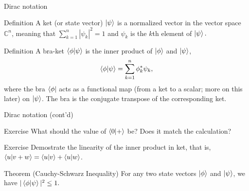 \documentclass{beamer}
\newcommand{\C}{\mathbb{C}}
\begin{document}
\begin{frame}{Dirac notation}

\begin{block}{Definition}
A ket (or state vector) $\ket{\psi}$ is a normalized vector in the vector space $\C^n$, meaning that $\sum_{k=1}^n |\psi_k|^2 = 1$  and $\psi_k$ is the $k$th element of $\ket\psi.$
\end{block}

\begin{block}{Definition}
A bra-ket $\braket{\phi|\psi}$ is the inner product of $\ket\phi$ and $\ket\psi$, $$ \braket{\phi|\psi} = \sum_{k=1}^n \phi_k^* \psi_k , $$ where the bra $\bra\phi$ acts as a functional map (from a ket to a scalar; more on this later) on $\ket\psi$. The bra is the conjugate transpose of the corresponding ket.
\end{block}
\end{frame}

\begin{frame}{Dirac notation (cont'd)}

\begin{block}{Exercise}
What should the value of $\braket{0 | +}$ be? Does it match the calculation?
\end{block}

\begin{block}{Exercise}
Demostrate the linearity of the inner product in ket, that is, $\braket{ u | v + w} = \braket{u | v} + \braket{u | w}$.
\end{block}

\begin{block}{Theorem (Cauchy-Schwarz Inequality)}
For any two state vectors $\ket\phi$ and $\ket\psi$, we have $ | \braket{\phi | \psi}|^2 \leq 1. $
\end{block}

\end{frame}
\end{document}
